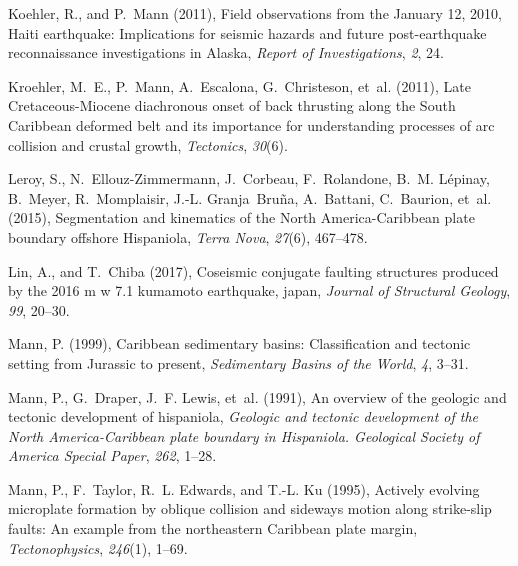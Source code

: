 \documentclass[linenumbers,draft]{agujournal}
\begin{document}
\begin{thebibliography}{62}
Koehler, R., and P.~Mann (2011), {Field observations from the January 12, 2010,
  Haiti earthquake: Implications for seismic hazards and future post-earthquake
  reconnaissance investigations in Alaska}, \textit{Report of Investigations},
  \textit{2}, 24.

Kroehler, M.~E., P.~Mann, A.~Escalona, G.~Christeson, et~al. (2011), {Late
  Cretaceous-Miocene diachronous onset of back thrusting along the South
  Caribbean deformed belt and its importance for understanding processes of arc
  collision and crustal growth}, \textit{Tectonics}, \textit{30}(6).

Leroy, S., N.~Ellouz-Zimmermann, J.~Corbeau, F.~Rolandone, B.~M. L{\'e}pinay,
  B.~Meyer, R.~Momplaisir, J.-L. Granja~Bru{\~n}a, A.~Battani, C.~Baurion,
  et~al. (2015), {Segmentation and kinematics of the North America-Caribbean
  plate boundary offshore Hispaniola}, \textit{Terra Nova}, \textit{27}(6),
  467--478.

Lin, A., and T.~Chiba (2017), Coseismic conjugate faulting structures produced
  by the 2016 m w 7.1 kumamoto earthquake, japan, \textit{Journal of Structural
  Geology}, \textit{99}, 20--30.

Mann, P. (1999), {Caribbean sedimentary basins: Classification and tectonic
  setting from Jurassic to present}, \textit{Sedimentary Basins of the World},
  \textit{4}, 3--31.

Mann, P., G.~Draper, J.~F. Lewis, et~al. (1991), An overview of the geologic
  and tectonic development of hispaniola, \textit{Geologic and tectonic
  development of the North America-Caribbean plate boundary in Hispaniola.
  Geological Society of America Special Paper}, \textit{262}, 1--28.

Mann, P., F.~Taylor, R.~L. Edwards, and T.-L. Ku (1995), Actively evolving
  microplate formation by oblique collision and sideways motion along
  strike-slip faults: {An} example from the northeastern {Caribbean} plate
  margin, \textit{Tectonophysics}, \textit{246}(1), 1--69.


\end{thebibliography}
\end{document}
